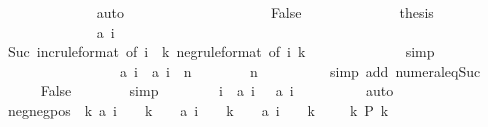 \begin{isabellebody}
\ \ \ \ \ \ \ \ \ \ \ \ \isamarkupfalse%
\ auto\isanewline
\ \ \ \ \ \ \ \ \isamarkupfalse%
\isanewline
\ \ \ \ \ \ \ \ \ \ \isamarkupfalse%
\ False\isanewline
\ \ \ \ \ \ \ \ \ \ \isamarkupfalse%
\ \isamarkupfalse%
\ {\isacharquery}thesis\isanewline
\ \ \ \ \ \ \ \ \ \ \ \ \isamarkupfalse%
\ {\isacharbackquoteopen}{\isacharquery}a\ i\ {\isacharless}\ {}{\isacharbackquoteclose}\isanewline
\ \ \ \ \ \ \ \ \ \ \ \ \isamarkupfalse%
\ Suc{\isacharparenleft}{}{\isacharparenright}\ inc{\isacharbrackleft}rule{\isacharunderscore}format{\isacharcomma}\ of\ {\isachardoublequoteopen}i\ {\isacharplus}\ {}{\isacharasterisk}k{\isachardoublequoteclose}{\isacharbrackright}\ neg{\isacharbrackleft}rule{\isacharunderscore}format{\isacharcomma}\ of\ i\ k{\isacharbrackright}\isanewline
\ \ \ \ \ \ \ \ \ \ \ \ \isamarkupfalse%
\ simp\isanewline
\ \ \ \ \ \ \ \ \isamarkupfalse%
\isanewline
\ \ \ \ \ \ \isamarkupfalse%
\isanewline
\ \ \ \ \isamarkupfalse%
\isanewline
\ \ \ \ \isamarkupfalse%
\ {\isachardoublequoteopen}{\isacharquery}a\ i\ {\isacharless}\ {\isacharquery}a\ {\isacharparenleft}i\ {\isacharplus}\ {}{\isacharasterisk}n{\isacharparenright}{\isachardoublequoteclose}\isanewline
\ \ \ \ \ \ \isamarkupfalse%
\ {\isacharbackquoteopen}n\ {\isasymge}\ {}{\isacharbackquoteclose}\isanewline
\ \ \ \ \ \ \isamarkupfalse%
\ {\isacharparenleft}simp\ add{\isacharcolon}\ numeral{\isacharunderscore}eq{\isacharunderscore}Suc{\isacharparenright}\isanewline
\ \ \ \ \isamarkupfalse%
\ False\isanewline
\ \ \ \ \ \ \isamarkupfalse%
\ simp\isanewline
\ \ \isamarkupfalse%
\isanewline
\isanewline
\ \ \isamarkupfalse%
\ \isamarkupfalse%
\ i\ \ {\isachardoublequoteopen}{\isacharquery}a\ i\ {\isacharless}\ {}{\isachardoublequoteclose}\ {\isachardoublequoteopen}{\isacharquery}a\ {\isacharparenleft}i\ {\isacharplus}\ {}{\isacharparenright}\ {\isacharless}\ {}{\isachardoublequoteclose}\isanewline
\ \ \ \ \isamarkupfalse%
\ auto\isanewline
\isanewline
\ \ \isamarkupfalse%
\ neg{\isacharunderscore}neg{\isacharunderscore}pos{\isacharcolon}\ {\isachardoublequoteopen}{\isasymforall}\ k{\isachardot}\ {\isacharquery}a\ {\isacharparenleft}i\ {\isacharplus}\ {}\ {\isacharasterisk}\ k{\isacharparenright}\ {\isacharless}\ {}\ {\isasymand}\ {\isacharquery}a\ {\isacharparenleft}i\ {\isacharplus}\ {}\ {\isacharplus}\ {}{\isacharasterisk}k{\isacharparenright}\ {\isacharless}\ {}\ {\isasymand}\ {\isacharquery}a\ {\isacharparenleft}i\ {\isacharplus}\ {}\ {\isacharplus}\ {}{\isacharasterisk}k{\isacharparenright}\ {\isachargreater}\ {}{\isachardoublequoteclose}\ {\isacharparenleft}\ {\isachardoublequoteopen}{\isasymforall}\ k{\isachardot}\ {\isacharquery}P\ k{\isachardoublequoteclose}{\isacharparenright}\isanewline

\end{isabellebody}
